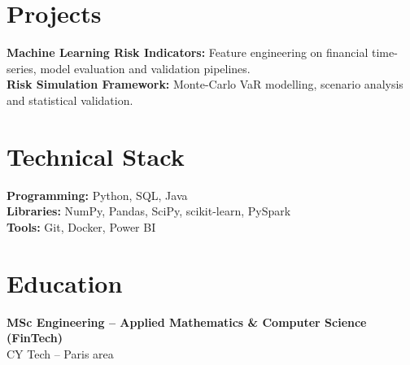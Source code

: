 \documentclass[10pt, letterpaper]{article}
\begin{document}
\section*{Projects}
\textbf{Machine Learning Risk Indicators:} Feature engineering on financial time-series, model evaluation and validation pipelines.\\
\textbf{Risk Simulation Framework:} Monte-Carlo VaR modelling, scenario analysis and statistical validation.

\section*{Technical Stack}
\textbf{Programming:} Python, SQL, Java\\
\textbf{Libraries:} NumPy, Pandas, SciPy, scikit-learn, PySpark\\
\textbf{Tools:} Git, Docker, Power BI

\section*{Education}
\textbf{MSc Engineering -- Applied Mathematics \& Computer Science (FinTech)}\\
CY Tech -- Paris area
\end{document}
